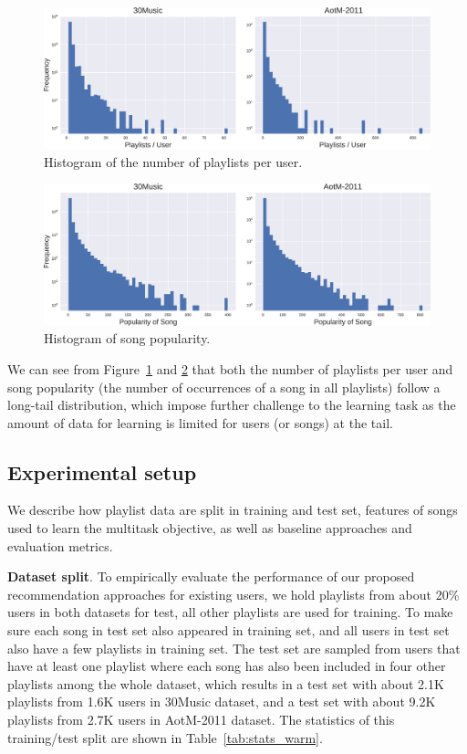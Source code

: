 \begin{figure}[h]
\centering
\includegraphics[width=\linewidth]{fig/hist_pluser.pdf}
\caption{Histogram of the number of playlists per user.}
\label{fig:hist_pluser}
\end{figure}

\begin{figure}[h]
\centering
\includegraphics[width=\linewidth]{fig/hist_songpop.pdf}
\caption{Histogram of song popularity.}
\label{fig:hist_songpop}
\end{figure}

We can see from Figure~\ref{fig:hist_pluser} and \ref{fig:hist_songpop} that both the number 
of playlists per user and song popularity (\ie the number of occurrences of a song in all playlists) 
follow a long-tail distribution, which impose further challenge to the learning task as the amount 
of data for learning is limited for users (or songs) at the tail.


\subsection{Experimental setup}
We describe how playlist data are split in training and test set,
features of songs used to learn the multitask objective, as well as 
baseline approaches and evaluation metrics.

{\bf Dataset split}.
To empirically evaluate the performance of our proposed recommendation approaches for existing users,
we hold playlists from about 20\% users in both datasets for test,
all other playlists are used for training.
To make sure each song in test set also appeared in training set, 
and all users in test set also have a few playlists in training set.
The test set are sampled from users that have at least one playlist where each song has also been
included in four other playlists among the whole dataset,
which results in a test set with about 2.1K playlists from 1.6K users in 30Music dataset,
and a test set with about 9.2K playlists from 2.7K users in AotM-2011 dataset.
The statistics of this training/test split are shown in Table~\ref{tab:stats_warm}.

